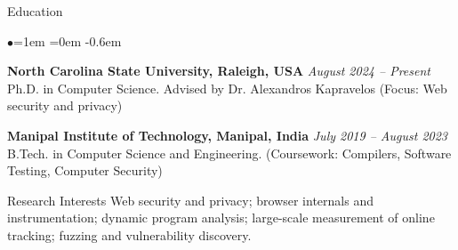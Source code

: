 \documentclass{resume} %
\date{\today}
\begin{document}
\begin{rSection}{Education}
\begin{list}{$\bullet$}{\leftmargin=1em \itemindent=0em}
\itemsep -0.6em
\item {\bf North Carolina State University, Raleigh, USA} \hfill {\em August 2024 -- Present}  \\ Ph.D. in Computer Science. Advised by Dr. Alexandros Kapravelos (Focus: Web security and privacy)\hfill
\item {\bf Manipal Institute of Technology, Manipal, India} \hfill {\em July 2019 -- August 2023}  \\ B.Tech. in Computer Science and Engineering. (Coursework: Compilers, Software Testing, Computer Security)\hfill
\end{list}
\end{rSection}
\begin{rSection}{Research Interests}
Web security and privacy; browser internals and instrumentation; dynamic program analysis; large-scale measurement of online tracking; fuzzing and vulnerability discovery.
\end{rSection}
\printbibliography[heading=none]
\end{document}
